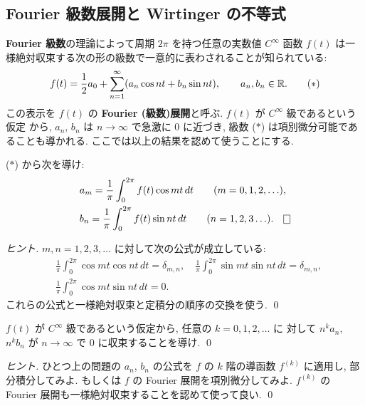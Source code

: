 \documentclass[12pt,twoside]{jarticle}
\begin{document}
\subsection{Fourier 級数展開と Wirtinger の不等式}

{\bf Fourier 級数}の理論によって周期 $2\pi$ を持つ任意の実数値 $C^\infty$ 函数 
$f(t)$ は一様絶対収束する次の形の級数で一意的に表わされることが知られている:
\begin{equation*}
 f(t) = \frac{1}{2}a_0 + \sum_{n=1}^\infty(a_n\cos nt + b_n\sin nt),
  \qquad a_n,b_n\in{\mathbb R}.
\tag{$*$}
\end{equation*}
この表示を $f(t)$ の {\bf Fourier (級数)展開}と呼ぶ.
$f(t)$ が $C^\infty$ 級であるという仮定
から, $a_n$, $b_n$ は $n\to\infty$ で急激に $0$ に近づき,
級数 ($*$) は項別微分可能であることも導かれる.
ここでは以上の結果を認めて使うことにする.

\begin{question}
 \label{q:Fourier-coeff}
 ($*$) から次を導け:
 \begin{align*}
  &
  a_m = \frac{1}{\pi}\int_0^{2\pi} f(t)\cos mt\,dt
  \qquad (m=0,1,2,\ldots),
  \\ &
  b_n = \frac{1}{\pi}\int_0^{2\pi} f(t)\sin nt\,dt
  \qquad (n=1,2,3\ldots).
  \qed
 \end{align*}
\end{question}

\begin{proof}[ヒント]
 $m,n=1,2,3,\ldots$ に対して次の公式が成立している:
 \begin{align*}
  &
  \frac{1}{\pi}\int_0^{2\pi} \cos mt \cos nt \,dt = \delta_{m,n},
  \quad
  \frac{1}{\pi}\int_0^{2\pi} \sin mt \sin nt \,dt = \delta_{m,n},
  \\ &
  \frac{1}{\pi}\int_0^{2\pi} \cos mt \sin nt \,dt = 0.
 \end{align*}
 これらの公式と一様絶対収束と定積分の順序の交換を使う.
 \qed
\end{proof}

\begin{question}
 $f(t)$ が $C^\infty$ 級であるという仮定から, 任意の $k=0,1,2,\ldots$ に
 対して $n^k a_n$, $n^k b_n$ が $n\to\infty$ で $0$ に収束することを導け.
 \qed
\end{question}

\begin{proof}[ヒント]
 ひとつ上の問題の $a_n$, $b_n$ の公式を $f$ の 
 $k$ 階の導函数 $f^{(k)}$ に適用し, 部分積分してみよ.
 もしくは $f$ の Fourier 展開を項別微分してみよ.
 $f^{(k)}$ の Fourier 展開も一様絶対収束することを認めて使って良い.
 \qed
\end{proof}
\end{document}
